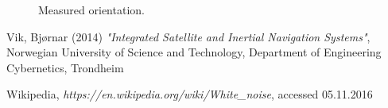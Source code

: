 \documentclass{article}
\begin{document}
\begin{figure}[!ht]
    \centering
    \caption{Measured orientation.}
    \label{fig:orientation_task3}
\end{figure}


\newpage
{}
\begin{thebibliography}{25}

	Vik, Bjørnar (2014)
	\emph{"Integrated Satellite and Inertial Navigation Systems"},
	Norwegian University of Science and Technology, Department of Engineering Cybernetics, Trondheim
	
	Wikipedia,
	\emph{https://en.wikipedia.org/wiki/White\_noise},
	accessed 05.11.2016
	
\end{thebibliography}
\end{document}
